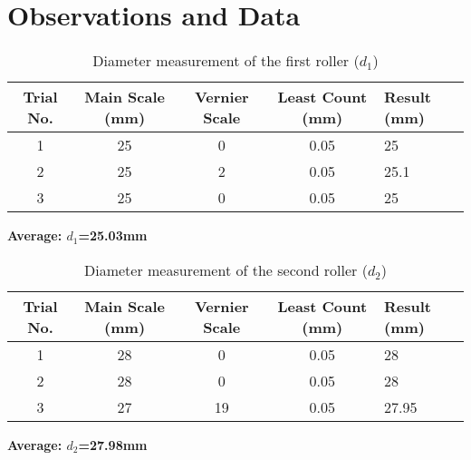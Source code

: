 \documentclass[12pt]{article}
\begin{document}
\section{Observations and Data}
\begin{table}[H]
	\centering
	\caption{Diameter measurement of the first roller ($d_1$)}
	\begin{tabularx}{\textwidth}{c c c c X}
		\toprule
		\textbf{Trial No.} & \textbf{Main Scale (mm)} & \textbf{Vernier Scale} & \textbf{Least Count (mm)} & \textbf{Result (mm)} \\
		\midrule
		1                  & 25                       & 0                      & 0.05                      & 25                   \\
		2                  & 25                       & 2                      & 0.05                      & 25.1                 \\
		3                  & 25                       & 0                      & 0.05                      & 25                   \\
		\bottomrule
	\end{tabularx}
\end{table}
\textbf{Average: $d_1$=25.03mm}

\begin{table}[H]
	\centering
	\caption{Diameter measurement of the second roller ($d_2$)}
	\begin{tabularx}{\textwidth}{ccccX}
		\toprule
		\textbf{Trial No.} & \textbf{Main Scale (mm)} & \textbf{Vernier Scale} & \textbf{Least Count (mm)} & \textbf{Result (mm)} \\
		\midrule
		1                  & 28                       & 0                      & 0.05                      & 28                   \\
		2                  & 28                       & 0                      & 0.05                      & 28                   \\
		3                  & 27                       & 19                     & 0.05                      & 27.95                \\
		\bottomrule
	\end{tabularx}
\end{table}
\textbf{Average: $d_2$=27.98mm}
\end{document}
